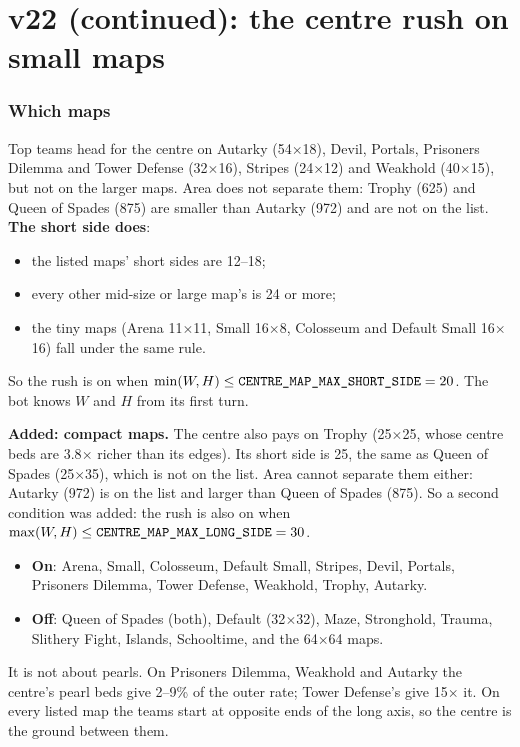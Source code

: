\documentclass[11pt,a4paper]{article}
\newcommand{\code}[1]{\texttt{\detokenize{#1}}}
\begin{document}
\part{v22 (continued): the centre rush on small maps}
\section{Which maps}
Top teams head for the centre on Autarky (54$\times$18), Devil, Portals, Prisoners Dilemma and Tower Defense (32$\times$16),
Stripes (24$\times$12) and Weakhold (40$\times$15), but not on the larger maps. Area does not separate them: Trophy (625) and
Queen of Spades (875) are smaller than Autarky (972) and are not on the list. \textbf{The short side does}:
\begin{itemize}
  \item the listed maps' short sides are 12--18;
  \item every other mid-size or large map's is 24 or more;
  \item the tiny maps (Arena 11$\times$11, Small 16$\times$8, Colosseum and Default Small 16$\times$16) fall under the same rule.
\end{itemize}
So the rush is on when $\min(W,H) \leq \code{CENTRE_MAP_MAX_SHORT_SIDE} = 20$. The bot knows $W$ and $H$ from its first turn.

\textbf{Added: compact maps.} The centre also pays on Trophy (25$\times$25, whose centre beds are 3.8$\times$ richer than its edges).
Its short side is 25, the same as Queen of Spades (25$\times$35), which is not on the list. Area cannot separate them either: Autarky
(972) is on the list and larger than Queen of Spades (875). So a second condition was added: the rush is also on when
$\max(W,H) \leq \code{CENTRE_MAP_MAX_LONG_SIDE} = 30$.
\begin{itemize}
  \item \textbf{On}: Arena, Small, Colosseum, Default Small, Stripes, Devil, Portals, Prisoners Dilemma, Tower Defense, Weakhold,
        Trophy, Autarky.
  \item \textbf{Off}: Queen of Spades (both), Default (32$\times$32), Maze, Stronghold, Trauma, Slithery Fight, Islands, Schooltime,
        and the 64$\times$64 maps.
\end{itemize}

It is not about pearls. On Prisoners Dilemma, Weakhold and Autarky the centre's pearl beds give 2--9\% of the outer rate;
Tower Defense's give 15$\times$ it. On every listed map the teams start at opposite ends of the long axis, so the centre is the
ground between them.
\end{document}
